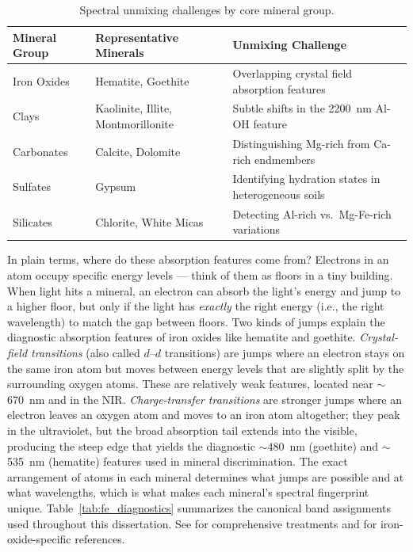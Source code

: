\documentclass[11pt]{report}
\begin{document}
\begin{table}[htbp]
\centering
\caption{Spectral unmixing challenges by core mineral group.}
\label{tab:unmixing}
\begin{tabular}{lll}
\hline
\textbf{Mineral Group} & \textbf{Representative Minerals} & \textbf{Unmixing Challenge} \\
\hline
Iron Oxides & Hematite, Goethite & Overlapping crystal field absorption features \\
Clays & Kaolinite, Illite, Montmorillonite & Subtle shifts in the 2200~nm Al-OH feature \\
Carbonates & Calcite, Dolomite & Distinguishing Mg-rich from Ca-rich endmembers \\
Sulfates & Gypsum & Identifying hydration states in heterogeneous soils \\
Silicates & Chlorite, White Micas & Detecting Al-rich vs.\ Mg-Fe-rich variations \\
\hline
\end{tabular}
\end{table}

In plain terms, where do these absorption features come from? Electrons in an atom occupy specific energy levels --- think of them as floors in a tiny building. When light hits a mineral, an electron can absorb the light's energy and jump to a higher floor, but only if the light has \emph{exactly} the right energy (i.e., the right wavelength) to match the gap between floors. Two kinds of jumps explain the diagnostic absorption features of iron oxides like hematite and goethite. \emph{Crystal-field transitions} (also called $d$--$d$ transitions) are jumps where an electron stays on the same iron atom but moves between energy levels that are slightly split by the surrounding oxygen atoms. These are relatively weak features, located near $\sim$670~nm and in the NIR. \emph{Charge-transfer transitions} are stronger jumps where an electron leaves an oxygen atom and moves to an iron atom altogether; they peak in the ultraviolet, but the broad absorption tail extends into the visible, producing the steep edge that yields the diagnostic $\sim$480~nm (goethite) and $\sim$535~nm (hematite) features used in mineral discrimination. The exact arrangement of atoms in each mineral determines what jumps are possible and at what wavelengths, which is what makes each mineral's spectral fingerprint unique. Table~\ref{tab:fe_diagnostics} summarizes the canonical band assignments used throughout this dissertation. See \cite{burns1993, clark1999} for comprehensive treatments and \cite{sherman1985, Jiang2014AlGoethite} for iron-oxide-specific references.
\end{document}
